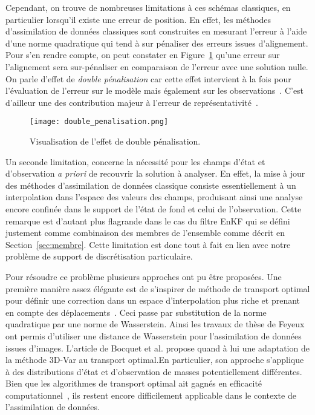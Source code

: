 Cependant, on trouve de nombreuses limitations à ces schémas classiques, en particulier lorsqu'il existe une erreur de position. En effet, les méthodes d'assimilation de données classiques sont construites en mesurant l'erreur à l'aide d'une norme quadratique qui tend à sur pénaliser des erreurs issues d'alignement. Pour s'en rendre compte, on peut constater en Figure~\ref{fig:double_penalization_error} qu'une erreur sur l'alignement sera sur-pénaliser en comparaison de l'erreur avec une solution nulle. On parle d'effet de \textit{double pénalisation} car cette effet intervient à la fois pour l'évaluation de l'erreur sur le modèle mais également sur les observations~\cite{amodei2009}. C'est d'ailleur une des contribution majeur à l'erreur de représentativité~\cite{janjic2018}.

\begin{figure}[h]
    \centering
    \texttt{[image: double\_penalisation.png]}
    \caption{Visualisation de l'effet de double pénalisation.}
    \label{fig:double_penalization_error}
\end{figure}

Un seconde limitation, concerne la nécessité pour les champs d'état et d'observation \textit{a priori} de recouvrir la solution à analyser. En effet, la mise à jour des méthodes d'assimilation de données classique consiste essentiellement à un interpolation dans l'espace des valeurs des champs, produisant ainsi une analyse encore confinée dans le support de l'état de fond et celui de l'observation. Cette remarque est d'autant plus flagrande dans le cas du filtre EnKF qui se défini justement comme combinaison des membres de l'ensemble comme décrit en Section~\ref{sec:membre}. Cette limitation est donc tout à fait en lien avec notre problème de support de discrétisation particulaire.


Pour résoudre ce problème plusieurs approches ont pu être proposées. Une première manière assez élégante est de s'inspirer de méthode de transport optimal pour définir une correction dans un espace d'interpolation plus riche et prenant en compte des déplacements~\cite{villani2009optimal,benamou_computational_2000}. Ceci passe par substitution de la norme quadratique par une norme de Wasserstein. Ainsi les travaux de thèse de Feyeux~\cite{feyeux_transport_2016} ont permis d'utiliser une distance de Wasserstein pour l'assimilation de données issues d'images. L'article de Bocquet et al. \cite{bocquet_bridging_2023} propose quand à lui une adaptation de la méthode 3D-Var au transport optimal.En particulier, son approche s'applique à des distributions d'état et d'observation de masses potentiellement différentes. Bien que les algorithmes de transport optimal ait gagnés en efficacité computationnel~\cite{cuturi_2014,peyre_computational_2019,Simsekli2018SlicedWassersteinFN}, ils restent encore difficilement applicable dans le contexte de l'assimilation de données.

